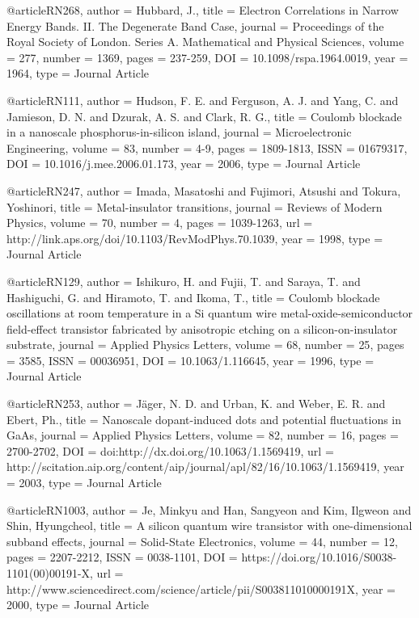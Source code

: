 @article{RN268,
   author = {Hubbard, J.},
   title = {Electron Correlations in Narrow Energy Bands. II. The Degenerate Band Case},
   journal = {Proceedings of the Royal Society of London. Series A. Mathematical and Physical Sciences},
   volume = {277},
   number = {1369},
   pages = {237-259},
   DOI = {10.1098/rspa.1964.0019},
   year = {1964},
   type = {Journal Article}
}

@article{RN111,
   author = {Hudson, F. E. and Ferguson, A. J. and Yang, C. and Jamieson, D. N. and Dzurak, A. S. and Clark, R. G.},
   title = {Coulomb blockade in a nanoscale phosphorus-in-silicon island},
   journal = {Microelectronic Engineering},
   volume = {83},
   number = {4-9},
   pages = {1809-1813},
   ISSN = {01679317},
   DOI = {10.1016/j.mee.2006.01.173},
   year = {2006},
   type = {Journal Article}
}

@article{RN247,
   author = {Imada, Masatoshi and Fujimori, Atsushi and Tokura, Yoshinori},
   title = {Metal-insulator transitions},
   journal = {Reviews of Modern Physics},
   volume = {70},
   number = {4},
   pages = {1039-1263},
   url = {http://link.aps.org/doi/10.1103/RevModPhys.70.1039},
   year = {1998},
   type = {Journal Article}
}

@article{RN129,
   author = {Ishikuro, H. and Fujii, T. and Saraya, T. and Hashiguchi, G. and Hiramoto, T. and Ikoma, T.},
   title = {Coulomb blockade oscillations at room temperature in a Si quantum wire metal-oxide-semiconductor field-effect transistor fabricated by anisotropic etching on a silicon-on-insulator substrate},
   journal = {Applied Physics Letters},
   volume = {68},
   number = {25},
   pages = {3585},
   ISSN = {00036951},
   DOI = {10.1063/1.116645},
   year = {1996},
   type = {Journal Article}
}

@article{RN253,
   author = {Jäger, N. D. and Urban, K. and Weber, E. R. and Ebert, Ph.},
   title = {Nanoscale dopant-induced dots and potential fluctuations in GaAs},
   journal = {Applied Physics Letters},
   volume = {82},
   number = {16},
   pages = {2700-2702},
   DOI = {doi:http://dx.doi.org/10.1063/1.1569419},
   url = {http://scitation.aip.org/content/aip/journal/apl/82/16/10.1063/1.1569419},
   year = {2003},
   type = {Journal Article}
}

@article{RN1003,
   author = {Je, Minkyu and Han, Sangyeon and Kim, Ilgweon and Shin, Hyungcheol},
   title = {A silicon quantum wire transistor with one-dimensional subband effects},
   journal = {Solid-State Electronics},
   volume = {44},
   number = {12},
   pages = {2207-2212},
   ISSN = {0038-1101},
   DOI = {https://doi.org/10.1016/S0038-1101(00)00191-X},
   url = {http://www.sciencedirect.com/science/article/pii/S003811010000191X},
   year = {2000},
   type = {Journal Article}
}

